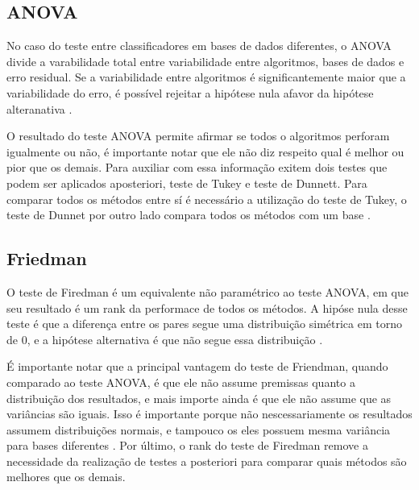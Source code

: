 \subsection{ANOVA}

No caso do teste entre classificadores em bases de dados diferentes, o ANOVA divide a varabilidade total entre variabilidade entre algoritmos, bases de dados e erro residual. Se a variabilidade entre algoritmos é significantemente maior que a variabilidade do erro, é possível rejeitar a hipótese nula afavor da hipótese alteranativa \cite{demvsar2006statistical}.

O resultado do teste ANOVA permite afirmar se todos o algoritmos perforam igualmente ou não, é importante notar que ele não diz respeito qual é melhor ou pior que os demais. Para auxiliar com essa informação exitem dois testes que podem ser aplicados aposteriori, teste de Tukey e teste de Dunnett. Para comparar todos os métodos entre sí é necessário a utilização do teste de Tukey, o teste de Dunnet por outro lado compara todos os métodos com um base \cite{demvsar2006statistical}.

\subsection{Friedman}

O teste de Firedman é um equivalente não paramétrico ao teste ANOVA, em que seu resultado é um rank da performace de todos os métodos. A hipóse nula desse teste é que a diferença entre os pares segue uma distribuição simétrica em torno de 0, e a hipótese alternativa é que não segue essa distribuição \cite{Casella2002}.

É importante notar que a principal vantagem do teste de Friendman, quando comparado ao teste ANOVA, é que ele não assume premissas quanto a distribuição dos resultados, e mais importe ainda é que ele não assume que as variâncias são iguais. Isso é importante porque não nescessariamente os resultados assumem distribuições normais, e tampouco os eles possuem mesma variância para bases diferentes \cite{demvsar2006statistical}. Por último, o rank do teste de Firedman remove a necessidade da realização de testes a posteriori para comparar quais métodos são melhores que os demais.







